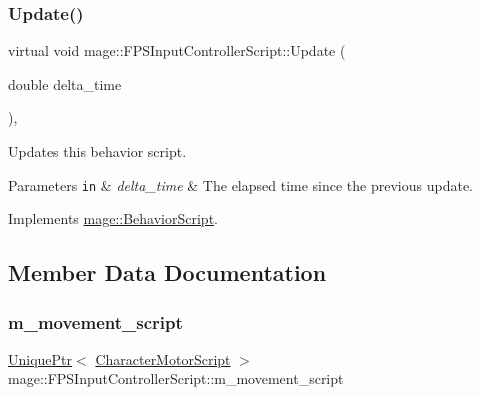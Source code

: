 \hypertarget{classmage_1_1_f_p_s_input_controller_script_ab78955a67341970a41b21ae943b81585}{}\label{classmage_1_1_f_p_s_input_controller_script_ab78955a67341970a41b21ae943b81585} 
\subsubsection{\texorpdfstring{Update()}{Update()}}
{\footnotesize\ttfamily virtual void mage\+::\+F\+P\+S\+Input\+Controller\+Script\+::\+Update (\begin{DoxyParamCaption}\item[{double}]{delta\+\_\+time }\end{DoxyParamCaption})\hspace{0.3cm}{\ttfamily [override]}, {\ttfamily [virtual]}}

Updates this behavior script.


\begin{DoxyParams}[1]{Parameters}
\mbox{\tt in}  & {\em delta\+\_\+time} & The elapsed time since the previous update. \\
\hline
\end{DoxyParams}


Implements \hyperlink{classmage_1_1_behavior_script_a905b6c83640cb91d19fecab3435f6feb}{mage\+::\+Behavior\+Script}.



\subsection{Member Data Documentation}
\hypertarget{classmage_1_1_f_p_s_input_controller_script_adef81e743004c4c182ceb71f9bc35ab6}{}\label{classmage_1_1_f_p_s_input_controller_script_adef81e743004c4c182ceb71f9bc35ab6} 
\subsubsection{\texorpdfstring{m\+\_\+movement\+\_\+script}{m\_movement\_script}}
{\footnotesize\ttfamily \hyperlink{namespacemage_a8c307fbcc33bce9b7f2aa4c26c3b95cf}{Unique\+Ptr}$<$ \hyperlink{classmage_1_1_character_motor_script}{Character\+Motor\+Script} $>$ mage\+::\+F\+P\+S\+Input\+Controller\+Script\+::m\+\_\+movement\+\_\+script\hspace{0.3cm}{\ttfamily [private]}}

